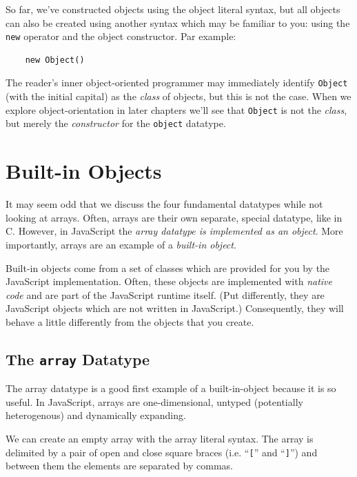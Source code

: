 \documentclass[11pt,letter]{book}
\begin{document}
    So far, we've constructed objects using the object literal syntax, but all objects can also be 
    created using another syntax which may be familiar to you: using the \texttt{new} operator and 
    the object constructor. Par example:
    
    \begin{verbatim}
    new Object()
    \end{verbatim}
    
    The reader's inner object-oriented programmer may immediately identify \texttt{Object} (with the 
    initial capital) as the \emph{class} of objects, but this is not the case. When we explore 
    object-orientation in later chapters we'll see that \texttt{Object} is not the \emph{class}, but 
    merely the \emph{constructor} for the \texttt{object} datatype.
    
    \section{Built-in Objects}
    It may seem odd that we discuss the four fundamental datatypes while not looking at arrays.
    Often, arrays are their own separate, special datatype, like in C. However, in JavaScript the 
    \emph{array datatype is implemented as an object}. More importantly, arrays are an example of a
    \emph{built-in object}.
    
    Built-in objects come from a set of classes which are provided for you by the JavaScript 
    implementation. Often, these objects are implemented with \emph{native code} and are part of 
    the JavaScript runtime itself. (Put differently, they are JavaScript objects which are not 
    written in JavaScript.) Consequently, they will behave a little differently from the objects 
    that you create.
    
    \subsection{The \texttt{array} Datatype}
    
    The array datatype is a good first example of a built-in-object because it is so useful. In 
    JavaScript, arrays are one-dimensional, untyped (potentially heterogenous) and dynamically 
    expanding. 
    
    We can create an empty array with the array literal syntax. The array is delimited by a pair of 
    open and close square braces (i.e. ``\texttt{[}'' and ``\texttt{]}'') and between them the 
    elements are separated by commas.
    
\end{document}
